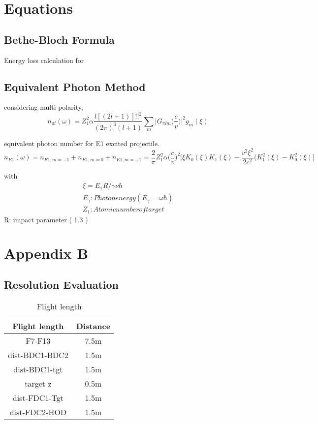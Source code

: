 \appendix
\chapter{Equations}
\section{Bethe-Bloch Formula}
Energy loss calculation for 

\section{Equivalent Photon Method}
considering multi-polarity, 
\begin{displaymath}
    n_{\pi l}(\omega)=Z^{2}_{1} \alpha \frac{l[(2l+1)]!!^{2}}{(2\pi)^{3}(l+1)}\sum_{m}\Big|G_{\pi l m}\big( \frac{c}{v}\big) \Big|^{2} g_{m}(\xi)
\end{displaymath} 

equivalent photon number for E1 excited projectile.
\begin{displaymath}
    n_{E1}(\omega)=n_{E1, m=-1}+n_{E1, m=0}+n_{E1, m=+1}=\frac{2}{\pi}Z^{2}_{1}\alpha\Big(\frac{c}{v}\Big)^{2}\Big[\xi K_{0}(\xi)K_{1}(\xi)-\frac{v^{2}\xi^{2}}{2c^{2}}(K^{2}_{1}(\xi)-K^{2}_{0}(\xi)\Big]
\end{displaymath}

with 
\begin{align}
    \xi=E_{\gamma}R/\gamma \nu \hbar\\
    E_{\gamma}: Photon energy( E_{\gamma}=\omega\hbar )\\
    Z_{1}: Atomic number of target
\end{align}
R: impact parameter ( 1.3 )\\


\chapter{Appendix B}
\section{Resolution Evaluation}

\begin{table}[h]
    \centering
    \begin{tabular}[h]{c|c}
        \hline
        Flight length & Distance \\
        \hline
        F7-F13 & 7.5m \\
        dist-BDC1-BDC2 & 1.5m \\
        dist-BDC1-tgt & 1.5m \\
        target z & 0.5m \\
        dist-FDC1-Tgt & 1.5m \\
        dist-FDC2-HOD & 1.5m \\
        \hline
    \end{tabular}
    \caption[short]{Flight length}
\end{table}


